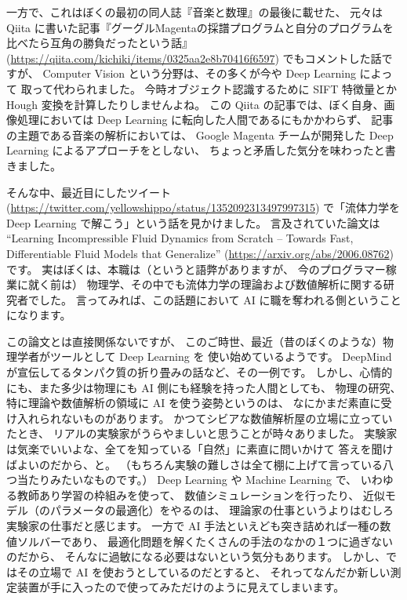 \documentclass[dvipdfmx,autodetect-engine,10pt,b5paper,papersize,openany,dvipsnames]{jsbook}
\begin{document}
\begin{multicols}{2}
一方で、これはぼくの最初の同人誌『音楽と数理』の最後に載せた、
元々は Qiita に書いた記事『グーグルMagentaの採譜プログラムと自分のプログラムを比べたら互角の勝負だったという話』
(\url{https://qiita.com/kichiki/items/0325aa2e8b70416f6597})
でもコメントした話ですが、
Computer Vision という分野は、その多くが今や Deep Learning によって
取って代わられました。
今時オブジェクト認識するために SIFT 特徴量とか Hough 変換を計算したりしませんよね。
この Qiita の記事では、ぼく自身、画像処理においては
Deep Learning に転向した人間であるにもかかわらず、
記事の主題である音楽の解析においては、 Google Magenta チームが開発した
Deep Learning によるアプローチをとしない、
ちょっと矛盾した気分を味わったと書きました。

そんな中、最近目にしたツイート
(\url{https://twitter.com/yellowshippo/status/1352092313497997315})
で「流体力学を Deep Learning で解こう」という話を見かけました。
言及されていた論文は
``Learning Incompressible Fluid Dynamics from Scratch
-- Towards Fast, Differentiable Fluid Models that Generalize''
(\url{https://arxiv.org/abs/2006.08762})
です。
実はぼくは、本職は（というと語弊がありますが、
今のプログラマー稼業に就く前は）
物理学、その中でも流体力学の理論および数値解析に関する研究者でした。
言ってみれば、この話題において AI に職を奪われる側ということになります。

この論文とは直接関係ないですが、
このご時世、最近（昔のぼくのような）物理学者がツールとして Deep Learning を
使い始めているようです。
DeepMind が宣伝してるタンパク質の折り畳みの話など、その一例です。
しかし、心情的にも、また多少は物理にも AI 側にも経験を持った人間としても、
物理の研究、特に理論や数値解析の領域に AI を使う姿勢というのは、
なにかまだ素直に受け入れられないものがあります。
かつてシビアな数値解析屋の立場に立っていたとき、
リアルの実験家がうらやましいと思うことが時々ありました。
実験家は気楽でいいよな、全てを知っている「自然」に素直に問いかけて
答えを聞けばよいのだから、と。
（もちろん実験の難しさは全て棚に上げて言っている八つ当たりみたいなものです。）
Deep Learning や Machine Learning で、
いわゆる教師あり学習の枠組みを使って、
数値シミュレーションを行ったり、
近似モデル（のパラメータの最適化）をやるのは、
理論家の仕事というよりはむしろ実験家の仕事だと感じます。
一方で AI 手法といえども突き詰めれば一種の数値ソルバーであり、
最適化問題を解くたくさんの手法のなかの１つに過ぎないのだから、
そんなに過敏になる必要はないという気分もあります。
しかし、ではその立場で AI を使おうとしているのだとすると、
それってなんだか新しい測定装置が手に入ったので使ってみただけのように見えてしまいます。


\end{multicols}
\end{document}
